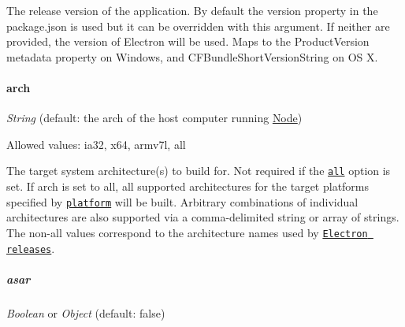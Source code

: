 The release version of the application. By default the {\ttfamily version} property in the {\ttfamily package.\+json} is used but it can be overridden with this argument. If neither are provided, the version of Electron will be used. Maps to the {\ttfamily Product\+Version} metadata property on Windows, and {\ttfamily C\+F\+Bundle\+Short\+Version\+String} on OS X.

\paragraph*{{\ttfamily arch}}

{\itshape String} (default\+: the arch of the host computer running \mbox{\hyperlink{classNode}{Node}})

Allowed values\+: {\ttfamily ia32}, {\ttfamily x64}, {\ttfamily armv7l}, {\ttfamily all}

The target system architecture(s) to build for. Not required if the \href{#all}{\tt {\ttfamily all}} option is set. If {\ttfamily arch} is set to {\ttfamily all}, all supported architectures for the target platforms specified by \href{#platform}{\tt {\ttfamily platform}} will be built. Arbitrary combinations of individual architectures are also supported via a comma-\/delimited string or array of strings. The non-\/{\ttfamily all} values correspond to the architecture names used by \href{https://github.com/electron/electron/releases}{\tt Electron releases}.

\subparagraph*{{\ttfamily asar}}

{\itshape Boolean} or {\itshape Object} (default\+: {\ttfamily false})

